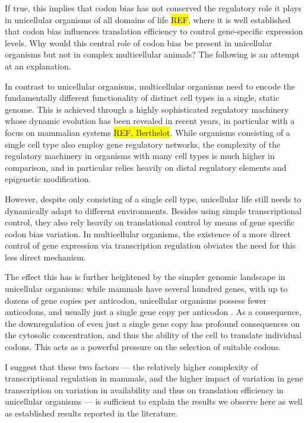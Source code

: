 If true, this implies that codon bias has not conserved the regulatory role it
plays in unicellular organisms of all domains of life \colorbox{yellow}{REF},
where it is well established that codon bias influences translation efficiency
to control gene-specific expression levels. Why would this central role of codon
bias be present in unicellular organisms but not in complex multicellular
animals? The following is an attempt at an explanation.

In contrast to unicellular organisms, multicellular organisms need to encode the
fundamentally different functionality of distinct cell types in a single, static
genome. This is achieved through a highly sophisticated regulatory machinery
whose dynamic evolution has been revealed in recent years, in particular with a
focus on mammalian systems \colorbox{yellow}{REF, Berthelot}. While  organisms
consisting of a single cell type also employ gene regulatory networks, the
complexity of the regulatory machinery in organisms with many cell types is much
higher in comparison, and in particular relies heavily on distal regulatory
elements and epigenetic modification.

However, despite only consisting of a single cell type, unicellular life still
needs to dynamically adapt to different environments. Besides using simple
transcriptional control, they also rely heavily on translational control by
means of gene specific codon bias variation. In multicellular organisms, the
existence of a more direct control of gene expression via transcription
regulation obviates the need for this less direct mechanism.

The effect this has is further heightened by the simpler genomic \trna landscape
in unicellular organisms: while mammals have several hundred \trna genes, with
up to dozens of gene copies per anticodon, unicellular organisms possess fewer
anticodons, and usually just a single \trna gene copy per anticodon
\citep{Chan:2009}. As a consequence, the downregulation of even just a single
\trna gene copy has profound consequences on the cytosolic \trna concentration,
and thus the ability of the cell to translate individual codons. This acts as a
powerful pressure on the selection of suitable codons.

I suggest that these two factors — the relatively higher complexity of
transcriptional regulation in mammals, and the higher impact of variation in
\trna gene transcription on variation in
\trna availability and thus on translation efficiency in unicellular organisms —
is sufficient to explain the results we observe here as well as established
results reported in the literature.

